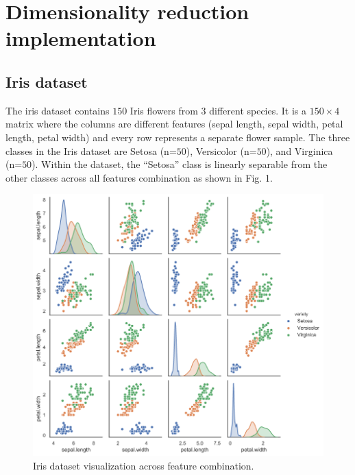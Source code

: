 \documentclass[conference]{IEEEtran}
\begin{document}
\section{Dimensionality reduction implementation}
\subsection{Iris dataset}
The iris dataset contains $150$ Iris flowers from $3$ different species. It is a $150\times 4$ matrix where the columns are different features (sepal length, sepal width, petal length, petal width) and every row represents a separate flower sample. The three classes in the Iris dataset are Setosa (n=$50$), Versicolor (n=$50$), and Virginica (n=$50$). Within the dataset, the “Setosa” class is linearly separable from the other classes across all features combination as shown in Fig. 1. 
\begin{figure}[h]
\centerline{\includegraphics[scale=0.3]{pair_plot.png}}
\caption{Iris dataset visualization across feature combination.}
\label{fig}
\end{figure}
\end{document}
